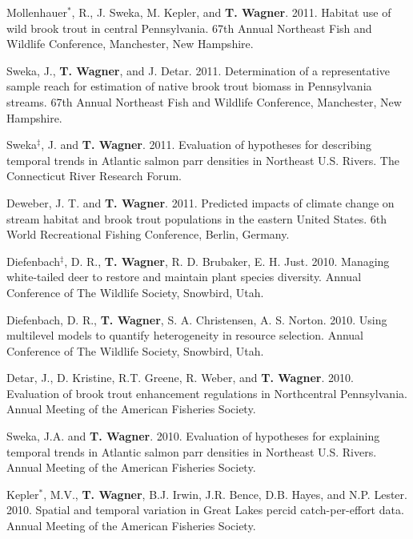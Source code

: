 \documentclass[10pt]{article}
\begin{document}
\begin{flushleft}
\begin{etaremune}
\item Mollenhauer$^*$, R., J. Sweka, M. Kepler, and  {\bf T. Wagner}. 2011. Habitat use of wild brook trout in central Pennsylvania. 67th Annual Northeast Fish and Wildlife Conference, Manchester, New Hampshire.

\item Sweka, J.,  {\bf T. Wagner}, and J. Detar. 2011. Determination of a representative sample reach for estimation of native brook trout biomass in Pennsylvania streams. 67th Annual Northeast Fish and Wildlife Conference, Manchester, New Hampshire.

\item Sweka$^\ddagger$, J. and  {\bf T. Wagner}. 2011. Evaluation of hypotheses for describing temporal trends in Atlantic salmon parr densities in Northeast U.S. Rivers. The Connecticut River Research Forum.

\item Deweber, J. T. and {\bf T. Wagner}. 2011. Predicted impacts of climate change on stream habitat and brook trout populations in the eastern United States. 6th World Recreational Fishing Conference, Berlin, Germany.


\item Diefenbach$^\ddagger$, D. R., {\bf T. Wagner}, R. D. Brubaker, E. H. Just. 2010. Managing white-tailed deer to restore and maintain plant species diversity. Annual Conference of The Wildlife Society, Snowbird, Utah. 

\item Diefenbach, D. R.,  {\bf T. Wagner}, S. A. Christensen, A. S. Norton. 2010. Using multilevel models to quantify heterogeneity in resource selection. Annual Conference of The Wildlife Society, Snowbird, Utah.

\item Detar, J., D. Kristine, R.T. Greene, R. Weber, and  {\bf T. Wagner}. 2010. Evaluation of brook trout enhancement regulations in Northcentral Pennsylvania. Annual Meeting of the American Fisheries Society. 

\item Sweka, J.A. and  {\bf T. Wagner}. 2010. Evaluation of hypotheses for explaining temporal trends in Atlantic salmon parr densities in Northeast U.S. Rivers. Annual Meeting of the American Fisheries Society.

\item Kepler$^*$, M.V.,  {\bf T. Wagner}, B.J. Irwin, J.R. Bence, D.B. Hayes, and N.P. Lester. 2010. Spatial and temporal variation in Great Lakes percid catch-per-effort data. Annual Meeting of the American Fisheries Society. 


\end{etaremune}
\end{flushleft}
\end{document}

